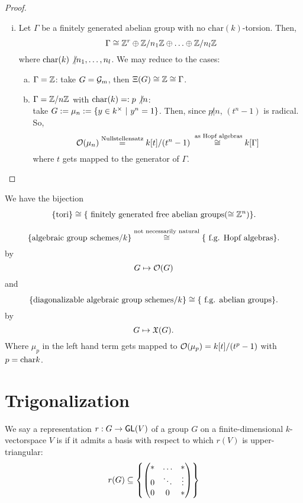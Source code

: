 \begin{proof}
\begin{enumerate}[(i)]
	\item Let $\Gamma$ be a finitely generated abelian group with no $\mathrm{char}(k)$-torsion. Then,
	\[\Gamma \overset{}{\cong} \mathbb{Z}^r \oplus \mathbb{Z}/n_1\mathbb{Z} \oplus \ldots \oplus \mathbb{Z}/n_l\mathbb{Z}\]
	where $\mathrm{char}(k) \not| n_1 , \ldots , n_l$. We may reduce to the cases:
	\begin{enumerate}[(a)]
		\item $\Gamma = \mathbb{Z}$: take $G = \mathcal{G}_m$, then $\Xi(G) \overset{}{\cong} \mathbb{Z} \overset{}{\cong} \Gamma$.
		\item $\Gamma = \mathbb{Z}/n\mathbb{Z}$ with $\mathrm{char}(k) =: p \not | n$:\\
		take $G:= \mu_n := \left\lbrace y \in k^\times ~ | ~ y^n = 1\right\rbrace$. Then, since $p\not| n$, $(t^n - 1)$ is radical.
		So, 
		\[ \mathcal{O}(\mu_n) \overset{\text{Nullstellensatz}}{=} k[t] /(t^n - 1) \overset{\text{ as Hopf algebras}}{\cong} k[\Gamma] \]
		where $t$ gets mapped to the generator of $\Gamma$.
	\end{enumerate}
 \end{enumerate}
\end{proof}
\begin{corollary}
We have the bijection
\[
\{\text{tori}\}
\overset{}{\cong}
\{ \text{ finitely generated free abelian groups} (\overset{}{\cong} \mathbb{Z}^n) \}.
\]
\end{corollary}

\begin{remark}
\[
\{\text{algebraic group schemes} / k\}
\overset{\text{not necessarily natural}}{\cong}
\{ \text{ f.g. Hopf algebras} \}.
\]
by
\[ G \mapsto \mathcal{O}(G) \]
and
\[
\{\text{diagonalizable algebraic group schemes}/k\}
\overset{}{\cong}
\{ \text{ f.g. abelian groups} \}.
	\]
by
\[ G \mapsto \mathfrak{X}(G). \]
Where $\mu_p$ in the left hand term gets mapped to $\mathcal{O}(\mu_p) = k[t] / (t^p - 1)$ with $p = \mathrm{char} k$.
\end{remark}

\newpage
\section{Trigonalization}
We say a representation $r : G \overset{}{\rightarrow} \textsf{GL}(V)$ of a group $G$ on a finite-dimensional $k$-vectorspace $V$ is  if it admits a basis with respect to which $r(V)$ is upper-triangular:
\[ r(G) \subseteq \left\lbrace
\left(\begin{matrix} * & \ldots & *\\ 0 & \ddots & \vdots \\ 0 & 0 & * \end{matrix}\right)
\right\rbrace \]

